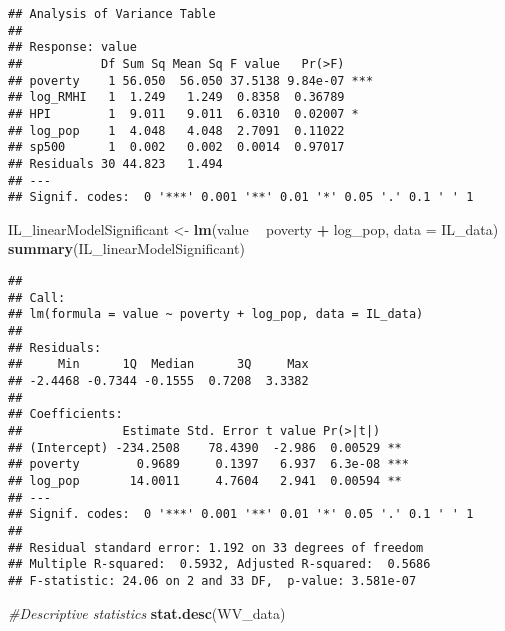 \documentclass[
]{article}
\newenvironment{Shaded}{\begin{snugshade}}{\end{snugshade}}
\newcommand{\CommentTok}[1]{\textcolor[rgb]{0.56,0.35,0.01}{\textit{#1}}}
\newcommand{\DataTypeTok}[1]{\textcolor[rgb]{0.13,0.29,0.53}{#1}}
\newcommand{\KeywordTok}[1]{\textcolor[rgb]{0.13,0.29,0.53}{\textbf{#1}}}
\newcommand{\NormalTok}[1]{#1}
\newcommand{\OperatorTok}[1]{\textcolor[rgb]{0.81,0.36,0.00}{\textbf{#1}}}
\newcommand{\StringTok}[1]{\textcolor[rgb]{0.31,0.60,0.02}{#1}}
\begin{document}
\begin{verbatim}
## Analysis of Variance Table
## 
## Response: value
##           Df Sum Sq Mean Sq F value   Pr(>F)    
## poverty    1 56.050  56.050 37.5138 9.84e-07 ***
## log_RMHI   1  1.249   1.249  0.8358  0.36789    
## HPI        1  9.011   9.011  6.0310  0.02007 *  
## log_pop    1  4.048   4.048  2.7091  0.11022    
## sp500      1  0.002   0.002  0.0014  0.97017    
## Residuals 30 44.823   1.494                     
## ---
## Signif. codes:  0 '***' 0.001 '**' 0.01 '*' 0.05 '.' 0.1 ' ' 1
\end{verbatim}

\begin{Shaded}
\begin{Highlighting}[]
\NormalTok{IL_linearModelSignificant <-}\StringTok{ }\KeywordTok{lm}\NormalTok{(value }\OperatorTok{~}\StringTok{ }\NormalTok{poverty }\OperatorTok{+}\StringTok{ }\NormalTok{log_pop, }\DataTypeTok{data =}\NormalTok{ IL_data)}
\KeywordTok{summary}\NormalTok{(IL_linearModelSignificant)}
\end{Highlighting}
\end{Shaded}

\begin{verbatim}
## 
## Call:
## lm(formula = value ~ poverty + log_pop, data = IL_data)
## 
## Residuals:
##     Min      1Q  Median      3Q     Max 
## -2.4468 -0.7344 -0.1555  0.7208  3.3382 
## 
## Coefficients:
##              Estimate Std. Error t value Pr(>|t|)    
## (Intercept) -234.2508    78.4390  -2.986  0.00529 ** 
## poverty        0.9689     0.1397   6.937  6.3e-08 ***
## log_pop       14.0011     4.7604   2.941  0.00594 ** 
## ---
## Signif. codes:  0 '***' 0.001 '**' 0.01 '*' 0.05 '.' 0.1 ' ' 1
## 
## Residual standard error: 1.192 on 33 degrees of freedom
## Multiple R-squared:  0.5932, Adjusted R-squared:  0.5686 
## F-statistic: 24.06 on 2 and 33 DF,  p-value: 3.581e-07
\end{verbatim}

\begin{Shaded}
\end{Shaded}

\begin{Shaded}
\begin{Highlighting}[]
\CommentTok{#Descriptive statistics}
\KeywordTok{stat.desc}\NormalTok{(WV_data)}
\end{Highlighting}
\end{Shaded}
\end{document}
